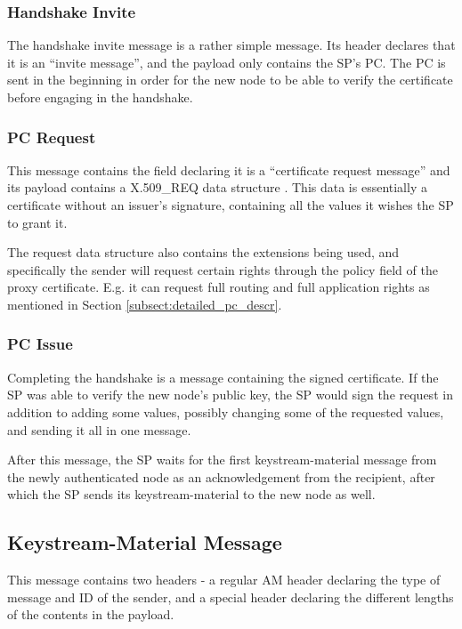 \subsubsection*{Handshake Invite}
The handshake invite message is a rather simple message. Its header declares
that it is an ``invite message'', and the payload only contains the SP's 
\ac{PC}. The \ac{PC} is sent in the beginning in order for the new node to be
able to verify the certificate before engaging in the handshake.

\subsubsection*{\acl{PC} Request}
This message contains the field declaring it is a ``certificate request
message'' and its payload contains a X.509\_REQ data structure
\cite{viega2002network}. This data is essentially a certificate without an
issuer's signature, containing all the values it wishes the \ac{SP} to grant
it.

The request data structure also contains the extensions being used, and
specifically the sender will request certain rights through the policy field of
the proxy certificate. E.g. it can request full routing and full application
rights as mentioned in Section \ref{subsect:detailed_pc_descr}.

\subsubsection*{\acf{PC} Issue}
Completing the handshake is a message containing the signed certificate. If the
\ac{SP} was able to verify the new node's public key, the \ac{SP} would sign the
request in addition to adding some values, possibly changing some of the
requested values, and sending it all in one message.

After this message, the \ac{SP} waits for the first keystream-material message
from the newly authenticated node as an acknowledgement from the recipient,
after which the \ac{SP} sends its keystream-material to the new node as well.

\subsection{Keystream-Material Message}
This message contains two headers - a regular AM header declaring the type of
message and ID of the sender, and a special header declaring the different
lengths of the contents in the payload.


